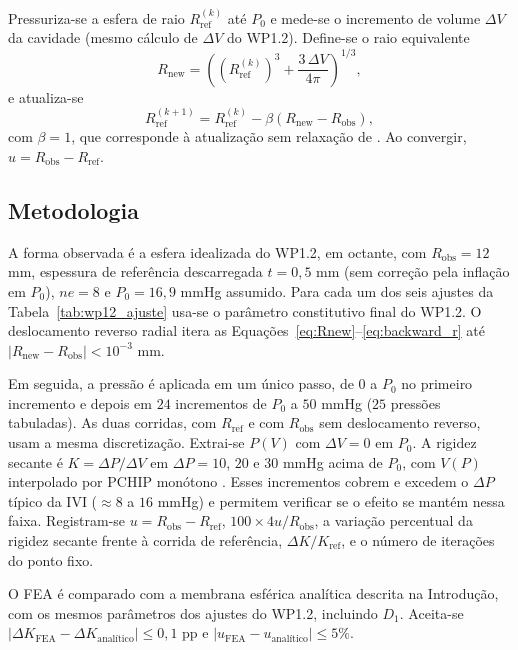 Pressuriza-se a esfera de raio $R_{\text{ref}}^{(k)}$ até $P_0$ e mede-se o incremento de volume $\Delta V$ da cavidade (mesmo cálculo de $\Delta V$ do WP1.2). Define-se o raio equivalente
\begin{equation}
R_{\text{new}}=\left(\left(R_{\text{ref}}^{(k)}\right)^{3}+\frac{3\,\Delta V}{4\pi}\right)^{1/3},
\label{eq:Rnew}
\end{equation}
e atualiza-se
\begin{equation}
R_{\text{ref}}^{(k+1)}=R_{\text{ref}}^{(k)}-\beta\left(R_{\text{new}}-R_{\text{obs}}\right),
\label{eq:backward_r}
\end{equation}
com $\beta=1$, que corresponde à atualização sem relaxação de \citet{bols2013}. Ao convergir, $u=R_{\text{obs}}-R_{\text{ref}}$.

\subsection{Metodologia}

A forma observada é a esfera idealizada do WP1.2, em octante, com $R_{\text{obs}}=12$ mm, espessura de referência descarregada $t=0{,}5$ mm (sem correção pela inflação em $P_0$), $ne=8$ e $P_0=16{,}9$ mmHg assumido. Para cada um dos seis ajustes da Tabela~\ref{tab:wp12_ajuste} usa-se o parâmetro constitutivo final do WP1.2. O deslocamento reverso radial itera as Equações~\ref{eq:Rnew}--\ref{eq:backward_r} até $|R_{\text{new}}-R_{\text{obs}}|<10^{-3}$ mm.

Em seguida, a pressão é aplicada em um único passo, de $0$ a $P_0$ no primeiro incremento e depois em $24$ incrementos de $P_0$ a $50$ mmHg ($25$ pressões tabuladas). As duas corridas, com $R_{\text{ref}}$ e com $R_{\text{obs}}$ sem deslocamento reverso, usam a mesma discretização. Extrai-se $P(V)$ com $\Delta V=0$ em $P_0$. A rigidez secante é $K=\Delta P/\Delta V$ em $\Delta P=10$, $20$ e $30$ mmHg acima de $P_0$, com $V(P)$ interpolado por PCHIP monótono \citep{fritsch1980,virtanen2020scipy}. Esses incrementos cobrem e excedem o $\Delta P$ típico da IVI ($\approx8$ a $16$ mmHg) e permitem verificar se o efeito se mantém nessa faixa. Registram-se $u=R_{\text{obs}}-R_{\text{ref}}$, $100\times4u/R_{\text{obs}}$, a variação percentual da rigidez secante frente à corrida de referência, $\Delta K/K_{\text{ref}}$, e o número de iterações do ponto fixo.

O FEA é comparado com a membrana esférica analítica descrita na Introdução, com os mesmos parâmetros dos ajustes do WP1.2, incluindo $D_1$. Aceita-se $|\Delta K_{\text{FEA}}-\Delta K_{\text{analítico}}|\le0{,}1$ pp e $|u_{\text{FEA}}-u_{\text{analítico}}|\le5\%$.

